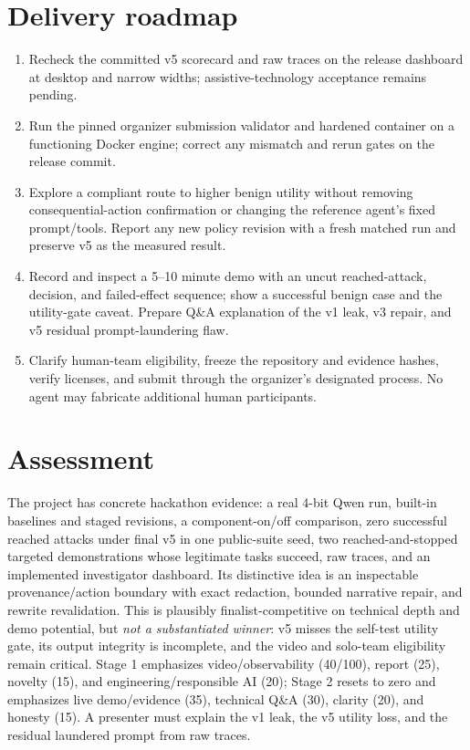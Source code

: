 \documentclass[11pt,a4paper]{article}
\begin{document}
\section{Delivery roadmap}
\begin{enumerate}
  \item Recheck the committed v5 scorecard and raw traces on the release dashboard at desktop and narrow widths; assistive-technology acceptance remains pending.
  \item Run the pinned organizer submission validator and hardened container on a functioning Docker engine; correct any mismatch and rerun gates on the release commit.
  \item Explore a compliant route to higher benign utility without removing consequential-action confirmation or changing the reference agent's fixed prompt/tools. Report any new policy revision with a fresh matched run and preserve v5 as the measured result.
  \item Record and inspect a 5--10 minute demo with an uncut reached-attack, decision, and failed-effect sequence; show a successful benign case and the utility-gate caveat. Prepare Q\&A explanation of the v1 leak, v3 repair, and v5 residual prompt-laundering flaw.
  \item Clarify human-team eligibility, freeze the repository and evidence hashes, verify licenses, and submit through the organizer's designated process. No agent may fabricate additional human participants.
\end{enumerate}

\section{Assessment}
The project has concrete hackathon evidence: a real 4-bit Qwen run, built-in baselines and staged revisions, a component-on/off comparison, zero successful reached attacks under final v5 in one public-suite seed, two reached-and-stopped targeted demonstrations whose legitimate tasks succeed, raw traces, and an implemented investigator dashboard. Its distinctive idea is an inspectable provenance/action boundary with exact redaction, bounded narrative repair, and rewrite revalidation. This is plausibly finalist-competitive on technical depth and demo potential, but \emph{not a substantiated winner}: v5 misses the self-test utility gate, its output integrity is incomplete, and the video and solo-team eligibility remain critical. Stage 1 emphasizes video/observability (40/100), report (25), novelty (15), and engineering/responsible AI (20); Stage 2 resets to zero and emphasizes live demo/evidence (35), technical Q\&A (30), clarity (20), and honesty (15). A presenter must explain the v1 leak, the v5 utility loss, and the residual laundered prompt from raw traces.
\end{document}
